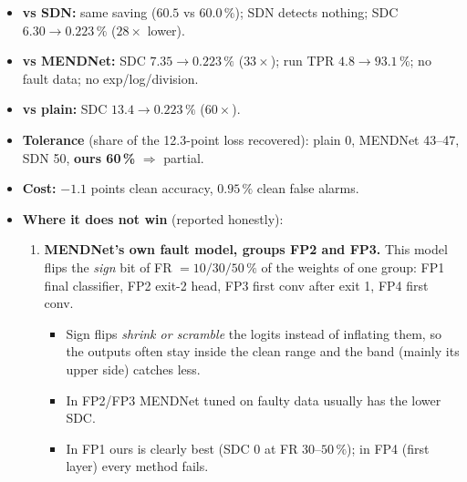 \documentclass[10pt,a4paper]{article}
\begin{document}
\begin{itemize}
  \item \textbf{vs SDN:} same saving ($60.5$ vs $60.0\,\%$); SDN detects nothing; SDC $6.30 \to 0.223\,\%$
        ($28\times$ lower).
  \item \textbf{vs MENDNet:} SDC $7.35 \to 0.223\,\%$ ($33\times$); run TPR $4.8 \to 93.1\,\%$; no fault data;
        no exp/log/division.
  \item \textbf{vs plain:} SDC $13.4 \to 0.223\,\%$ ($60\times$).
  \item \textbf{Tolerance} (share of the 12.3-point loss recovered): plain 0, MENDNet 43--47, SDN 50,
        \textbf{ours 60\,\%} $\Rightarrow$ partial.
  \item \textbf{Cost:} $-1.1$ points clean accuracy, $0.95\,\%$ clean false alarms.
  \item \textbf{Where it does not win} (reported honestly):
  \begin{enumerate}
    \item \textbf{MENDNet's own fault model, groups FP2 and FP3.} This model flips the \emph{sign} bit of
          FR $=10/30/50\,\%$ of the weights of one group: FP1 final classifier, FP2 exit-2 head,
          FP3 first conv after exit 1, FP4 first conv.
    \begin{itemize}
      \item Sign flips \emph{shrink or scramble} the logits instead of inflating them, so the outputs often stay
            inside the clean range and the band (mainly its upper side) catches less.
      \item In FP2/FP3 MENDNet tuned on faulty data usually has the lower SDC.
      \item In FP1 ours is clearly best (SDC $0$ at FR $30$--$50\,\%$); in FP4 (first layer) every method fails.
    \end{itemize}
  \end{enumerate}
\end{itemize}
\end{document}
